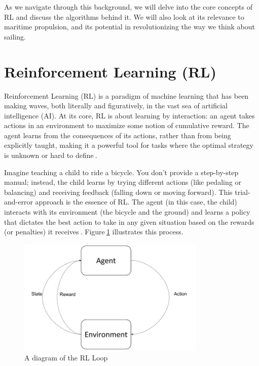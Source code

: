 As we navigate through this background, we will delve into the core concepts of RL and discuss the algorithms behind it. We will also look at its relevance to maritime propulsion, and its potential in revolutionizing the way we think about sailing.

\section{Reinforcement Learning (RL)}\label{RL_background}

Reinforcement Learning (RL) is a paradigm of machine learning that has been making waves, both literally and figuratively, in the vast sea of artificial intelligence (AI). At its core, RL is about learning by interaction: an agent takes actions in an environment to maximize some notion of cumulative reward. The agent learns from the consequences of its actions, rather than from being explicitly taught, making it a powerful tool for tasks where the optimal strategy is unknown or hard to define$~$\cite{sutton2018reinforcement}.

Imagine teaching a child to ride a bicycle. You don't provide a step-by-step manual; instead, the child learns by trying different actions (like pedaling or balancing) and receiving feedback (falling down or moving forward). This trial-and-error approach is the essence of RL. The agent (in this case, the child) interacts with its environment (the bicycle and the ground) and learns a policy that dictates the best action to take in any given situation based on the rewards (or penalties) it receives$~$\cite{watkins1992qlearning}. Figure$~$\ref{fig:rl_diagram} illustrates this process.

\begin{figure}
    \centering
    \includegraphics[width=0.8\textwidth]{Images/RL_Loop.png}
    \caption{A diagram of the RL Loop}
    \label{fig:rl_diagram}
\end{figure}

